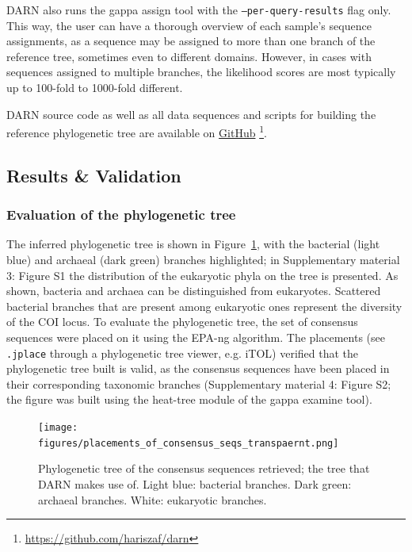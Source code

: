    DARN also runs the gappa assign tool with the \texttt{--per-query-results} flag only. 
   This way, the user can have a thorough overview of each sample’s sequence assignments, as a sequence may be assigned to more than one branch of the reference tree, sometimes even to different domains. 
   However, in cases with sequences assigned to multiple branches, the likelihood scores are most typically up to 100-fold to 1000-fold different.

   DARN source code as well as all data sequences and scripts for building the reference phylogenetic tree are available on \href{https://github.com/hariszaf/darn}{GitHub} \footnote{
      \href{https://github.com/hariszaf/darn}{https://github.com/hariszaf/darn}
   }.



   \subsection{Results \& Validation}
   \label{darn-results}
   \subsubsection*{Evaluation of the phylogenetic tree}
   \label{darn-results-tree-evaluation}

   The inferred phylogenetic tree is shown in Figure~\ref{fig:darn-ref-placements}, with the bacterial (light blue) and archaeal (dark green) branches highlighted;
   in Supplementary material 3: Figure S1 the distribution of the eukaryotic phyla on the tree is presented. 
   As shown, bacteria and archaea can be distinguished from eukaryotes. 
   Scattered bacterial branches that are present among eukaryotic ones represent the diversity of the COI locus. 
   To evaluate the phylogenetic tree, the set of consensus sequences were placed on it using the EPA-ng algorithm. 
   The placements (see \texttt{.jplace} through a phylogenetic tree viewer, e.g. iTOL) verified that the phylogenetic tree built is valid, as the consensus sequences have been placed in their corresponding taxonomic branches (Supplementary material 4: Figure S2; the figure was built using the heat-tree module of the gappa examine tool).

   \begin{figure}[h]
      \centering
      \texttt{[image: figures/placements\_of\_consensus\_seqs\_transpaernt.png]}
      \caption[Placements of the consensus COI sequences on the reference COI tree]{
         Phylogenetic tree of the consensus sequences retrieved; the tree that DARN makes use of. Light blue: bacterial branches. 
         Dark green: archaeal branches. White: eukaryotic branches.
      }
      \label{fig:darn-ref-placements}
   \end{figure}


